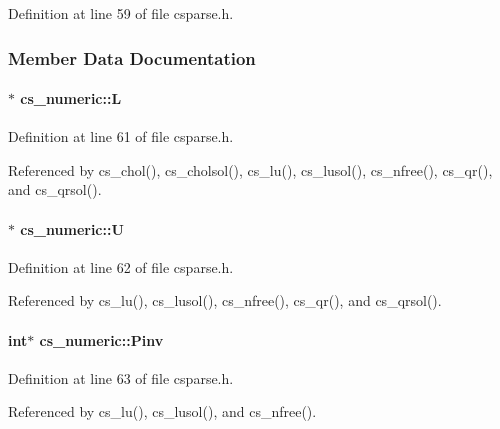 Definition at line 59 of file csparse.\-h.



\subsubsection{Member Data Documentation}
\hypertarget{structcs__numeric_a93a8cf26f01d3df51b41acc690f120d7}{
\paragraph[{L}]{$\ast$ cs\-\_\-numeric\-::\-L}}\label{structcs__numeric_a93a8cf26f01d3df51b41acc690f120d7}


Definition at line 61 of file csparse.\-h.



Referenced by cs\-\_\-chol(), cs\-\_\-cholsol(), cs\-\_\-lu(), cs\-\_\-lusol(), cs\-\_\-nfree(), cs\-\_\-qr(), and cs\-\_\-qrsol().

\hypertarget{structcs__numeric_a1e07204edb10064ca1e471289fced1cb}{
\paragraph[{U}]{$\ast$ cs\-\_\-numeric\-::\-U}}\label{structcs__numeric_a1e07204edb10064ca1e471289fced1cb}


Definition at line 62 of file csparse.\-h.



Referenced by cs\-\_\-lu(), cs\-\_\-lusol(), cs\-\_\-nfree(), cs\-\_\-qr(), and cs\-\_\-qrsol().

\hypertarget{structcs__numeric_a485727ef230d7e61b735fad674135d78}{
\paragraph[{Pinv}]{\setlength{\rightskip}{0pt plus 5cm}int$\ast$ cs\-\_\-numeric\-::\-Pinv}}\label{structcs__numeric_a485727ef230d7e61b735fad674135d78}


Definition at line 63 of file csparse.\-h.



Referenced by cs\-\_\-lu(), cs\-\_\-lusol(), and cs\-\_\-nfree().

